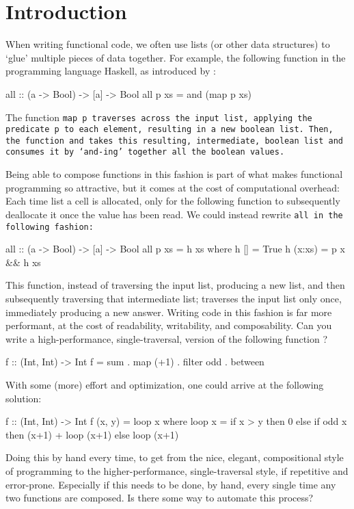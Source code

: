 \section{Introduction}
When writing functional code, we often use lists (or other data structures) to `glue' multiple pieces of data together.
For example, the following function in the programming language Haskell, as introduced by \cite{Gill1993}: %
\begin{code}
all :: (a -> Bool) -> [a] -> Bool
all p xs = and (map p xs)
\end{code}
The function \tt{map p} traverses across the input list, applying the predicate \tt{p} to each element, resulting in a new boolean list.
Then, the function \tt{and} takes this resulting, intermediate, boolean list and consumes it by `and-ing' together all the boolean values.

Being able to compose functions in this fashion is part of what makes functional programming so attractive, but it comes at the cost of computational overhead:
Each time list a cell is allocated, only for the following function to subsequently deallocate it once the value has been read.
We could instead rewrite \tt{all} in the following fashion:
\begin{code}
all :: (a -> Bool) -> [a] -> Bool
all p xs = h xs
  where h []     = True
        h (x:xs) = p x && h xs
\end{code}
This function, instead of traversing the input list, producing a new list, and then subsequently traversing that intermediate list; traverses the input list only once, immediately producing a new answer.
Writing code in this fashion is far more performant, at the cost of readability, writability, and composability.
Can you write a high-performance, single-traversal, version of the following function \citep{Harper2011}?
\begin{code}
f :: (Int, Int) -> Int
f = sum . map (+1) . filter odd . between
\end{code}
With some (more) effort and optimization, one could arrive at the following solution:
\begin{code}
f :: (Int, Int) -> Int
f (x, y) = loop x
  where loop x = if x > y
                 then 0
                 else if odd x
                      then (x+1) + loop (x+1)
                      else loop (x+1)
\end{code}
Doing this by hand every time, to get from the nice, elegant, compositional style of programming to the higher-performance, single-traversal style, if repetitive and error-prone.
Especially if this needs to be done, by hand, every single time any two functions are composed.
Is there some way to automate this process?

